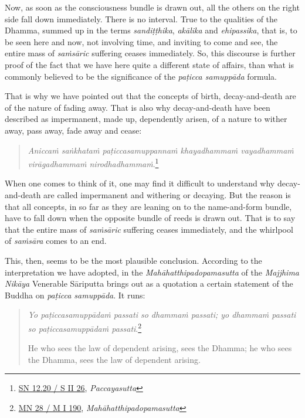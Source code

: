 Now, as soon as the consciousness bundle is drawn out, all the others on the right side fall down immediately. There is no interval. True to the qualities of the Dhamma, summed up in the terms \emph{sandiṭṭhika}, \emph{akālika} and \emph{ehipassika}, that is, to be seen here and now, not involving time, and inviting to come and see, the entire mass of \emph{saṁsāric} suffering ceases immediately. So, this discourse is further proof of the fact that we have here quite a different state of affairs, than what is commonly believed to be the significance of the \emph{paṭicca samuppāda} formula.

That is why we have pointed out that the concepts of birth, decay-and-death are of the nature of fading away. That is also why decay-and-death have been described as impermanent, made up, dependently arisen, of a nature to wither away, pass away, fade away and cease:

\begin{quote}
\emph{Aniccaṁ saṅkhataṁ paṭiccasamuppannaṁ khayadhammaṁ vayadhammaṁ virāgadhammaṁ nirodhadhammaṁ}.\footnote{\href{https://suttacentral.net/sn12.20/pli/ms}{SN 12.20 / S II 26}, \emph{Paccayasutta}}
\end{quote}

When one comes to think of it, one may find it difficult to understand why decay-and-death are called impermanent and withering or decaying. But the reason is that all concepts, in so far as they are leaning on to the name-and-form bundle, have to fall down when the opposite bundle of reeds is drawn out. That is to say that the entire mass of \emph{saṁsāric} suffering ceases immediately, and the whirlpool of \emph{saṁsāra} comes to an end.

This, then, seems to be the most plausible conclusion. According to the interpretation we have adopted, in the \emph{Mahāhatthipadopamasutta} of the \emph{Majjhima Nikāya} Venerable Sāriputta brings out as a quotation a certain statement of the Buddha on \emph{paṭicca samuppāda}. It runs:

\begin{quote}
\emph{Yo paṭiccasamuppādaṁ passati so dhammaṁ passati; yo dhammaṁ passati so paṭiccasamuppādaṁ passati}.\footnote{\href{https://suttacentral.net/mn28/pli/ms}{MN 28 / M I 190}, \emph{Mahāhatthipadopamasutta}}

He who sees the law of dependent arising, sees the Dhamma; he who sees the Dhamma, sees the law of dependent arising.
\end{quote}

